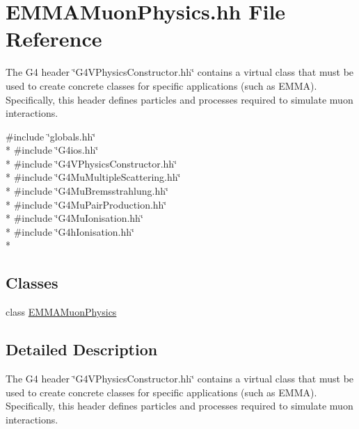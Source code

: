 \hypertarget{EMMAMuonPhysics_8hh}{\section{E\-M\-M\-A\-Muon\-Physics.\-hh File Reference}
\label{EMMAMuonPhysics_8hh}
}


The G4 header \char`\"{}\-G4\-V\-Physics\-Constructor.\-hh\char`\"{} contains a virtual class that must be used to create concrete classes for specific applications (such as E\-M\-M\-A). Specifically, this header defines particles and processes required to simulate muon interactions.  


{\ttfamily \#include \char`\"{}globals.\-hh\char`\"{}}\\*
{\ttfamily \#include \char`\"{}G4ios.\-hh\char`\"{}}\\*
{\ttfamily \#include \char`\"{}G4\-V\-Physics\-Constructor.\-hh\char`\"{}}\\*
{\ttfamily \#include \char`\"{}G4\-Mu\-Multiple\-Scattering.\-hh\char`\"{}}\\*
{\ttfamily \#include \char`\"{}G4\-Mu\-Bremsstrahlung.\-hh\char`\"{}}\\*
{\ttfamily \#include \char`\"{}G4\-Mu\-Pair\-Production.\-hh\char`\"{}}\\*
{\ttfamily \#include \char`\"{}G4\-Mu\-Ionisation.\-hh\char`\"{}}\\*
{\ttfamily \#include \char`\"{}G4h\-Ionisation.\-hh\char`\"{}}\\*
\subsection*{Classes}
\begin{DoxyCompactItemize}
\item 
class \hyperlink{classEMMAMuonPhysics}{E\-M\-M\-A\-Muon\-Physics}
\end{DoxyCompactItemize}


\subsection{Detailed Description}
The G4 header \char`\"{}\-G4\-V\-Physics\-Constructor.\-hh\char`\"{} contains a virtual class that must be used to create concrete classes for specific applications (such as E\-M\-M\-A). Specifically, this header defines particles and processes required to simulate muon interactions. 